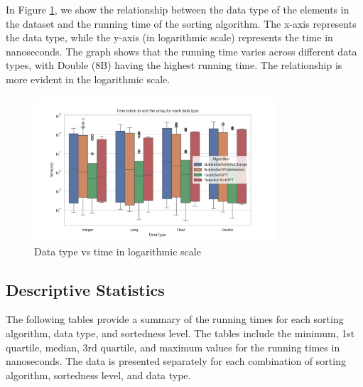 \documentclass[unicode,11pt,a4paper,oneside,numbers=endperiod,openany]{scrartcl}
\begin{document}
    In Figure \ref{fig:hip3}, we show the relationship between the data type of the elements in the dataset and the running time of the sorting algorithm. The x-axis represents the data type, while the y-axis (in logarithmic scale) represents the time in nanoseconds. The graph shows that the running time varies across different data types, with Double (8B) having the highest running time. The relationship is more evident in the logarithmic scale.\\
\hfill
        \begin{figure}[htbp]
            \centering
            \includegraphics[width=0.8\textwidth]{./fig/hip3.png}
            \caption{Data type vs time in logarithmic scale}
            \label{fig:hip3}
        \end{figure}


    \subsection{Descriptive Statistics}

    The following tables provide a summary of the running times for each sorting algorithm, data type, and sortedness level. The tables include the minimum, 1st quartile, median, 3rd quartile, and maximum values for the running times in nanoseconds. The data is presented separately for each combination of sorting algorithm, sortedness level, and data type.\\
\end{document}
